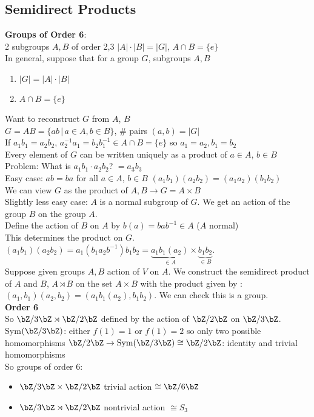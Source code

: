 
\subsection{Semidirect Products}

\textbf{Groups of Order 6}: \\
2 subgroups $A,B$ of order 2,3 \quad $|A| \cdot |B| = |G|$, $A \cap B = \{e\}$ \\

\noindent 
In general, suppose that for a group $G$, subgroups $A, B$
\begin{enumerate}
    \item $|G| = |A| \cdot |B|$
    \item $A \cap B = \{e\}$
\end{enumerate}
Want to reconstruct $G$ from $A$, $B$ \\
$G = AB = \{ab \, | \, a \in A, b \in B \}$, \# pairs $(a,b) = |G|$ \\
If $a_1b_1 = a_2b_2$, $a_2^{-1}a_1 = b_2b_1^{-1} \in A \cap B = \{e\}$ so $a_1 = a_2, b_1 = b_2$ \\
Every element of $G$ can be written uniquely as a product of $a \in A$, $b \in B$ \\

\noindent
Problem: What is $a_1b_1 \cdot a_2b_2$? \quad $=a_3b_3$ \\
Easy case: $ab=ba$ for all $a \in A$, $b \in B$ \quad $(a_1b_1)(a_2b_2) = (a_1a_2)(b_1b_2)$ \\
We can view $G$ as the product of $A,B \to G = A \times B$ \\
Slightly less easy case: $A$ is a normal subgroup of $G$. We get an action of the group $B$ on the group $A$. \\
Define the action of $B$ on $A$ by $b(a)=bab^{-1} \in A$ ($A$ normal) \\
This determines the product on $G$. $(a_1b_1)(a_2b_2)=a_1(b_1a_2b^{-1})b_1b_2 = \underbrace{a_1b_1(a_2)}_{\in A} \times \underbrace{b_1b_2}_{\in B}$. \\
Suppose given groups $A,B$ action of $V$ on $A$. We construct the semidirect product of $A$ and $B$, $A \rtimes B$ on the set $A \times B$ with the product given by : $(a_1, b_1)(a_2, b_2) = (a_1b_1(a_2), b_1b_2)$. We can check this is a group. \\

\noindent
\textbf{Order 6} \\
So $\bZ/3\bZ \rtimes \bZ/2\bZ$ defined by the action of $\bZ/2\bZ$ on $\bZ/3\bZ$. \\
Sym$(\bZ/3\bZ)$: either $f(1)=1$ or $f(1)=2$ so only two possible homomorphisms $\bZ/2\bZ \to \text{Sym}(\bZ/3\bZ) \cong \bZ/2\bZ$: identity and trivial homomorphisms \\
So groups of order 6: 
\begin{itemize}
    \item $\bZ/3\bZ \times \bZ/2\bZ$ \quad trivial action $\cong \bZ/6\bZ$ 
    \item $\bZ/3\bZ \rtimes \bZ/2\bZ$ \quad nontrivial action $\cong S_3$ 
\end{itemize} 

